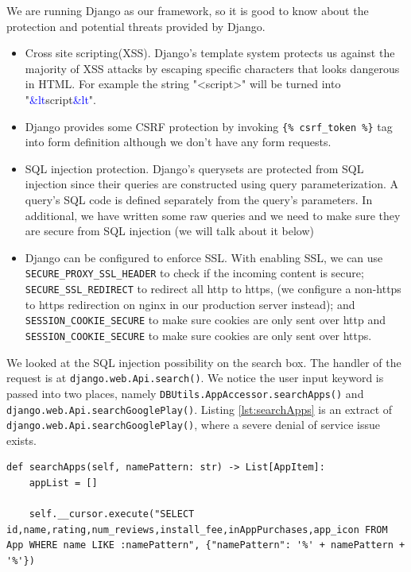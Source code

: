 \documentclass[12pt, a4paper]{article}
\newcommand{\code}[1]{\texttt{#1}}
\begin{document}
We are running Django as our framework, so it is good to know about the protection and potential threats provided by Django.
\begin{itemize}
    \item Cross site scripting(XSS). Django's template system protects us against the majority of XSS attacks by escaping specific characters that looks dangerous in HTML. For example the string "<script>" will be turned into "\textcolor{blue}{\&lt}script\textcolor{blue}{\&lt}".
    \item Django provides some CSRF protection by invoking \code{\{\% csrf\_token \%\}} tag into form definition although we don't have any form requests.
    \item SQL injection protection. Django’s querysets are protected from SQL injection since their queries are constructed using query parameterization. A query’s SQL code is defined separately from the query’s parameters. In additional, we have written some raw queries and we need to make sure they are secure from SQL injection (we will talk about it below)
    \item Django can be configured to enforce SSL. With enabling SSL, we can use \code{SECURE\_PROXY\_SSL\_HEADER} to check if the incoming content is secure; \code{SECURE\_SSL\_REDIRECT} to redirect all http to https, (we configure a non-https to https redirection on nginx in our production server instead); and \code{SESSION\_COOKIE\_SECURE} to make sure cookies are only sent over http and \code{SESSION\_COOKIE\_SECURE} to make sure cookies are only sent over https.
\end{itemize}


We looked at the SQL injection possibility on the search box. The handler of the request is at \code{django.web.Api.search()}. We notice the user input keyword is passed into two places, namely \code{DBUtils.AppAccessor.\linebreak[0]searchApps()} and \code{django.web.Api.searchGooglePlay()}. Listing \ref{lst:searchApps} is an extract of \code{django.web.Api.searchGooglePlay()}, where a severe denial of service issue exists.

\begin{lstlisting}[frame=tb, caption=DBUtils.AppAccessor.searchApps(), label=lst:searchApps]
def searchApps(self, namePattern: str) -> List[AppItem]:
	appList = []

	self.__cursor.execute("SELECT id,name,rating,num_reviews,install_fee,inAppPurchases,app_icon FROM App WHERE name LIKE :namePattern", {"namePattern": '%' + namePattern + '%'})
\end{lstlisting}
\end{document}
